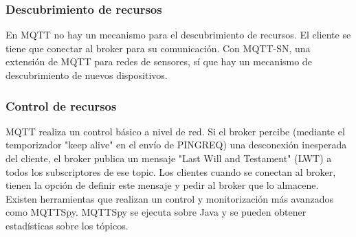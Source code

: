 \documentclass[12pt, twoside]{book}
\begin{document}
\subsubsection*{Descubrimiento de recursos}
En MQTT no hay un mecanismo para el descubrimiento de recursos. El cliente se tiene que conectar al broker para su comunicación. Con MQTT-SN, una extensión de MQTT para redes de sensores, sí que hay un mecanismo de descubrimiento de nuevos dispositivos.
\subsubsection*{Control de recursos}
MQTT realiza un control básico a nivel de red. Si el broker percibe (mediante el temporizador "keep alive" en el envío de PINGREQ) una desconexión inesperada del cliente, el broker publica un mensaje "Last Will and Testament" (LWT) a todos los subscriptores de ese topic. Los clientes cuando se conectan al broker, tienen la opción de definir este mensaje y  pedir al broker que lo almacene.\\
Existen herramientas que realizan un control y monitorización más avanzados como MQTTSpy. MQTTSpy se ejecuta sobre Java y se pueden obtener estadísticas sobre los tópicos.
\end{document}
